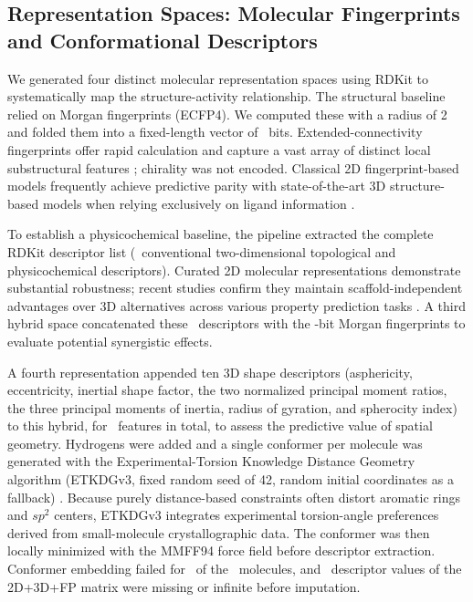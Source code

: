 
\subsection{Representation Spaces: Molecular Fingerprints and Conformational Descriptors}

We generated four distinct molecular representation spaces using RDKit \cite{landrum2025} to systematically map the structure-activity relationship. The structural baseline relied on Morgan fingerprints (ECFP4). We computed these with a radius of 2 and folded them into a fixed-length vector of \MorganNFeaturesTotal\ bits. Extended-connectivity fingerprints offer rapid calculation and capture a vast array of distinct local substructural features \cite{rogers2010}; chirality was not encoded. Classical 2D fingerprint-based models frequently achieve predictive parity with state-of-the-art 3D structure-based models when relying exclusively on ligand information \cite{gao2020}.

To establish a physicochemical baseline, the pipeline extracted the complete RDKit descriptor list (\RdkitTwoDNFeaturesTotal\ conventional two-dimensional topological and physicochemical descriptors). Curated 2D molecular representations demonstrate substantial robustness; recent studies confirm they maintain scaffold-independent advantages over 3D alternatives across various property prediction tasks \cite{tiwari2026}. A third hybrid space concatenated these \RdkitTwoDNFeaturesTotal\ descriptors with the \MorganNFeaturesTotal-bit Morgan fingerprints to evaluate potential synergistic effects.

A fourth representation appended ten 3D shape descriptors (asphericity, eccentricity, inertial shape factor, the two normalized principal moment ratios, the three principal moments of inertia, radius of gyration, and spherocity index) to this hybrid, for \RdkitTwoDThreeDFpNFeaturesTotal\ features in total, to assess the predictive value of spatial geometry. Hydrogens were added and a single conformer per molecule was generated with the Experimental-Torsion Knowledge Distance Geometry algorithm (ETKDGv3, fixed random seed of 42, random initial coordinates as a fallback) \cite{riniker2015}. Because purely distance-based constraints often distort aromatic rings and $sp^2$ centers, ETKDGv3 integrates experimental torsion-angle preferences derived from small-molecule crystallographic data. The conformer was then locally minimized with the MMFF94 force field before descriptor extraction. Conformer embedding failed for \RdkitTwoDThreeDFpNThreeDFailed\ of the \DataNMain\ molecules, and \RdkitTwoDThreeDFpNCellsMissing\ descriptor values of the 2D+3D+FP matrix were missing or infinite before imputation.

